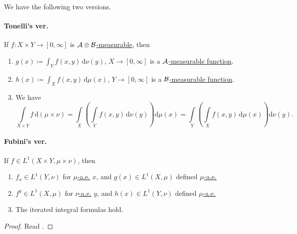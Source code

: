 \begin{theorem}\label{thm:Fubini-Tonelli-theorem}
	We have the following two versions.

	\paragraph{Tonelli's ver.} If \(f\colon X\times Y\to [0, \infty ]\) is \hyperref[def:A-measurable-function]{\(\mathcal{\MakeUppercase{a}} \otimes \mathcal{\MakeUppercase{b}} \)-measurable},
	then
	\begin{enumerate}
		\item \(g(x)\coloneqq \int_Y f(x, y)\,\mathrm{d} \nu (y)\), \(X\to [0, \infty ]\) is a \hyperref[def:A-measurable-function]{\(\mathcal{\MakeUppercase{a}}\)-measurable function}.
		\item \(h(x)\coloneqq \int_X f(x, y)\,\mathrm{d} \mu (x)\), \(Y\to [0, \infty ]\) is a \hyperref[def:A-measurable-function]{\(\mathcal{\MakeUppercase{b}}\)-measurable function}.
		\item We have
		      \begingroup\makeatletter\def\f@size{8}\check@mathfonts
		      \[
			      \int\limits_{X\times Y} f \,\mathrm{d}(\mu \times \nu ) = \int\limits _X\left(\int\limits _Y f(x, y)\,\mathrm{d}\nu (y)\right)\mathrm{d} \mu (x) = \int\limits _Y\left(\int\limits_X f(x, y)\,\mathrm{d} \mu (x)\right)\mathrm{d} \nu (y).
		      \]
		      \endgroup
	\end{enumerate}

	\paragraph{Fubini's ver.} If \(f\in L^1(X\times Y, \mu \times \nu )\), then
	\begin{enumerate}
		\item \(f_{x} \in L^1(Y, \nu )\) for \hyperref[def:mu-almost-everywhere]{\(\mu\)-a.e.} \(x\), and \(g(x)\in L^1(X, \mu )\) defined \hyperref[def:mu-almost-everywhere]{\(\mu\)-a.e.}
		\item \(f^{y} \in L^1(X, \mu )\) for \hyperref[def:mu-almost-everywhere]{\(\nu\)-a.e.} \(y\), and \(h(x)\in L^1(Y, \nu )\) defined \hyperref[def:mu-almost-everywhere]{\(\mu\)-a.e.}
		\item The iterated integral formulas hold.
	\end{enumerate}
\end{theorem}
\begin{proof}
	Read \cite{folland1999real}.
\end{proof}
